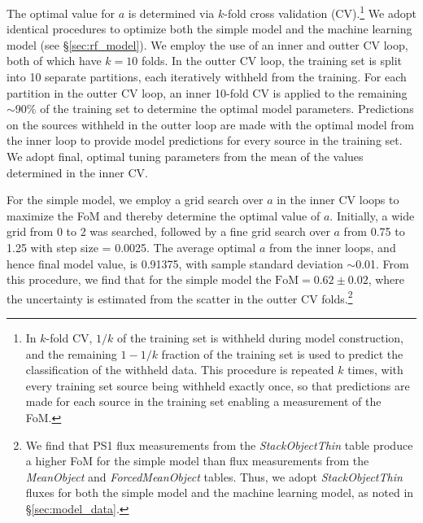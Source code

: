 \documentclass[twocolumn]{aastex62}
\begin{document}
\begin{CJK*}{UTF8}{gbsn}
The optimal value for $a$ is determined via $k$-fold cross validation
(CV).\footnote{In $k$-fold CV, $1/k$ of the training set is withheld during
model construction, and the remaining $1-1/k$ fraction of the training set is
used to predict the classification of the withheld data. This
procedure is repeated $k$ times, with every training set source
being withheld exactly once, so that predictions are made for each source in
the training set enabling a measurement of the FoM.} We adopt identical
procedures to optimize both the simple model and the machine learning model
(see \S\ref{sec:rf_model}). We employ the use of an inner and outter CV
loop, both of which have $k = 10$ folds. In the outter CV loop, the training
set is split into 10 separate partitions, each iteratively withheld from the
training. For each partition in the outter CV loop, an inner 10-fold CV is
applied to the remaining $\sim$90\% of the training set to determine the
optimal model parameters. Predictions on the sources withheld in the outter
loop are made with the optimal model from the inner loop to provide model
predictions for every source in the training set. We adopt final, optimal
tuning parameters from the mean of the values determined in the inner CV.

For the simple model, we employ a grid search over $a$ in the inner CV loops
to maximize the FoM and thereby determine the optimal value of $a$.
Initially, a wide grid from 0 to 2 was searched, followed by a fine grid
search over $a$ from 0.75 to 1.25 with step size = 0.0025. The average
optimal $a$ from the inner loops, and hence final model value, is 0.91375,
with sample standard deviation $\sim$0.01. From this procedure, we find that
for the simple model the $\mathrm{FoM} = 0.62 \pm 0.02$, where the
uncertainty is estimated from the scatter in the outter CV
folds.\footnote{We find that PS1 flux measurements from the
\textit{StackObjectThin} table produce a higher FoM for the simple model
than flux measurements from the \textit{MeanObject} and
\textit{ForcedMeanObject} tables. Thus, we adopt \textit{StackObjectThin}
fluxes for both the simple model and the machine learning model, as noted in
\S\ref{sec:model_data}.}



\end{CJK*}
\end{document}
